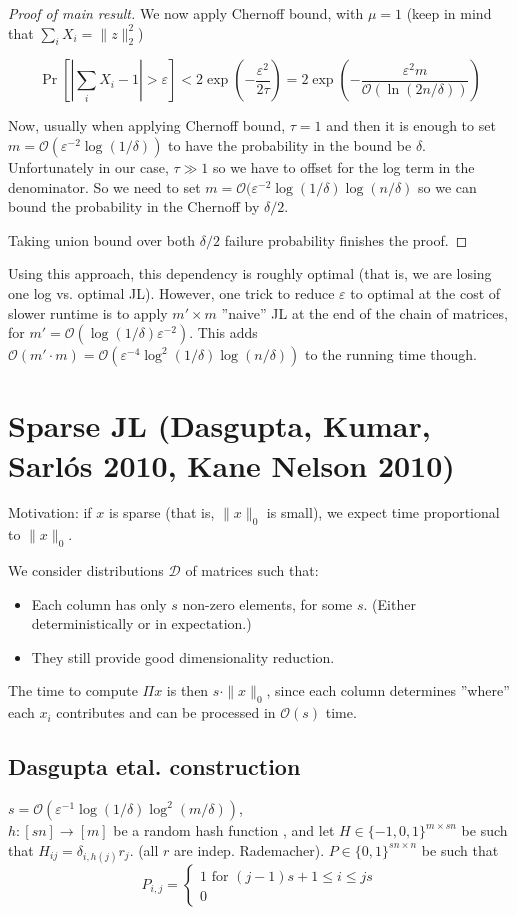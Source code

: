 \documentclass[11pt]{article}
\newcommand{\eps}{\varepsilon}
\newcommand{\bigo}{\mathcal{O}}
\begin{document}
\begin{proof}[Proof of main result]
We now apply Chernoff bound, with $\mu = 1$ (keep in mind that $\sum_i X_i = \|z\|_2^2$)

$$\Pr[ | \sum_i X_i - 1| > \eps  ] < 2 \exp(- \frac{\eps^2 }{2 \tau} ) = 2 \exp\left(- \frac{\eps^2 m}{\bigo(\ln(2n/\delta)) }\right)$$


Now, usually when applying Chernoff bound, $\tau=1$ and then it is enough to set $m = \bigo(\varepsilon^{-2} \log (1/\delta))$ to have the probability in the bound be $\delta$. Unfortunately in our case, $\tau \gg 1$ so we have to offset for the log term in the denominator. So we need to set 
$m = \bigo(\varepsilon^{-2} \log (1/\delta) \log(n/\delta)$ so we can bound the probability in the Chernoff by $\delta/2$.

Taking union bound over both $\delta/2$ failure probability finishes the proof.
\end{proof}

Using this approach, this dependency is roughly optimal (that is, we are losing one log vs. optimal JL). However, one trick to reduce $\eps$ to optimal at the cost of slower runtime is to apply $m' \times m$ ''naive'' JL at the end of the chain of matrices, for $m' = \bigo(\log (1/\delta) \eps^{-2})$. This adds $\bigo(m' \cdot m) = \bigo(\eps^{-4} \log^2 (1/\delta) \log (n/\delta))$ to the running time though.

\section{Sparse JL (Dasgupta, Kumar, Sarlós 2010, Kane Nelson 2010)}

Motivation: if $x$ is sparse (that is, $\|x\|_0$ is small), we expect time proportional to $\|x\|_0$. 

We consider distributions $\mathcal{D}$ of matrices such that:
\begin{itemize}
\item Each column has only $s$ non-zero elements, for some $s$. (Either deterministically or in expectation.)
\item They still provide good dimensionality reduction.
\end{itemize}

The time to compute $\Pi x$ is then $s \cdot \|x\|_0$, since each column determines ''where'' each $x_i$ contributes and can be processed in $\bigo(s)$ time.

\subsection{Dasgupta etal. construction}
$s = \bigo(\eps^{-1} \log (1/\delta) \log^2 (m/\delta))$,\\ $h : [sn] \to [m]$ be a random hash function , and let
$H \in \{-1,0,1\}^{m \times sn}$ be such that $H_{ij} = \delta_{i,h(j)} r_j$. (all $r$ are indep. Rademacher).
$P \in \{0,1\}^{sn \times n}$ be such that
$$P_{i,j} = \begin{cases}1 \text{ for } (j-1)s + 1 \le i \le js\\0 \end{cases}$$
\end{document}
